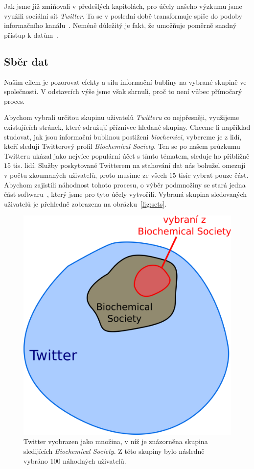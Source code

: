 \documentclass[12pt, a4paper]{article}
\numberwithin{equation}{section} 	%
\begin{document}
Jak jsme již zmiňovali v předešlých kapitolách, pro účely našeho výzkumu jsme využili sociální síť \textit{Twitter}. Ta se v poslední době transformuje spíše do podoby informačního kanálu~\cite{whyNotFb}. Neméně důležitý je fakt, že umožňuje poměrně snadný přístup k datům~\cite{tweepy, twitterAPI}.

\subsection{Sběr dat}
\noindent Našim cílem je pozorovat efekty a sílu informační bubliny na vybrané skupině ve společnosti. V odstavcích výše jsme však shrnuli, proč to není vůbec přímočarý proces.

Abychom vybrali určitou skupinu uživatelů \textit{Twitteru} co nejpřesněji, využijeme existujících stránek, které sdružují příznivce hledané skupiny. Chceme-li například studovat, jak jsou informační bublinou postiženi \textit{biochemici}, vybereme je z lidí, kteří sledují Twitterový profil \textit{Biochemical Society}. Ten se po našem průzkumu Twitteru ukázal jako nejvíce populární účet s tímto tématem, sleduje ho přibližně $15$ tis. lidí. Služby poskytované Twitterem na stahování dat nás bohužel omezují v počtu zkoumaných uživatelů, proto musíme ze všech $15$ tisíc vybrat pouze část. Abychom zajistili náhodnost tohoto procesu, o výběr podmnožiny se stará jedna část softwaru~\cite{myRepo}, který jsme pro tyto účely vytvořili. Vybraná skupina sledovaných uživatelů je přehledně zobrazena na obrázku~\autoref{fig:sets}.
\begin{figure}[h]
\centering
\includegraphics[scale=0.27]{./Pics/sets.png}
    \caption{Twitter vyobrazen jako množina, v níž je znázorněna skupina sledijících \textit{Biochemical Society}. Z této skupiny bylo následně vybráno 100 náhodných uživatelů.}
\label{fig:sets}
\end{figure}
\end{document}
